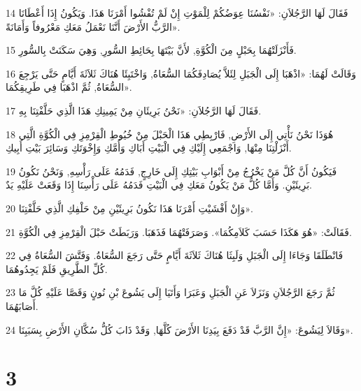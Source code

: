 \par 14 فَقَالَ لَهَا الرَّجُلاَنِ: «نَفْسُنَا عِوَضُكُمْ لِلْمَوْتِ إِنْ لَمْ تُفْشُوا أَمْرَنَا هَذَا. وَيَكُونُ إِذَا أَعْطَانَا الرَّبُّ الأَرْضَ أَنَّنَا نَعْمَلُ مَعَكِ مَعْرُوفاً وَأَمَانَةً».
\par 15 فَأَنْزَلَتْهُمَا بِحَبْلٍ مِنَ الْكُوَّةِ, لأَنَّ بَيْتَهَا بِحَائِطِ السُّورِ, وَهِيَ سَكَنَتْ بِالسُّورِ.
\par 16 وَقَالَتْ لَهُمَا: «اذْهَبَا إِلَى الْجَبَلِ لِئَلاَّ يُصَادِفَكُمَا السُّعَاةُ, وَاخْتَبِئَا هُنَاكَ ثَلاَثَةَ أَيَّامٍ حَتَّى يَرْجِعَ السُّعَاةُ, ثُمَّ اذْهَبَا فِي طَرِيقِكُمَا».
\par 17 فَقَالَ لَهَا الرَّجُلاَنِ: «نَحْنُ بَرِيئَانِ مِنْ يَمِينِكِ هَذَا الَّذِي حَلَّفْتِنَا بِهِ.
\par 18 هُوَذَا نَحْنُ نَأْتِي إِلَى الأَرْضِ, فَارْبِطِي هَذَا الْحَبْلَ مِنْ خُيُوطِ الْقِرْمِزِ فِي الْكُوَّةِ الَّتِي أَنْزَلْتِنَا مِنْهَا, وَاجْمَعِي إِلَيْكِ فِي الْبَيْتِ أَبَاكِ وَأُمَّكِ وَإِخْوَتَكِ وَسَائِرَ بَيْتِ أَبِيكِ.
\par 19 فَيَكُونُ أَنَّ كُلَّ مَنْ يَخْرُجُ مِنْ أَبْوَابِ بَيْتِكِ إِلَى خَارِجٍ, فَدَمُهُ عَلَى رَأْسِهِ, وَنَحْنُ نَكُونُ بَرِيئَيْنِ. وَأَمَّا كُلُّ مَنْ يَكُونُ مَعَكِ فِي الْبَيْتِ فَدَمُهُ عَلَى رَأْسِنَا إِذَا وَقَعَتْ عَلَيْهِ يَدٌ.
\par 20 وَإِنْ أَفْشَيْتِ أَمْرَنَا هَذَا نَكُونُ بَرِيئَيْنِ مِنْ حَلْفِكِ الَّذِي حَلَّفْتِنَا».
\par 21 فَقَالَتْ: «هُوَ هَكَذَا حَسَبَ كَلاَمِكُمَا». وَصَرَفَتْهُمَا فَذَهَبَا. وَرَبَطَتْ حَبْلَ الْقِرْمِزِ فِي الْكُوَّةِ.
\par 22 فَانْطَلَقَا وَجَاءَا إِلَى الْجَبَلِ وَلَبِثَا هُنَاكَ ثَلاَثَةَ أَيَّامٍ حَتَّى رَجَعَ السُّعَاةُ. وَفَتَّشَ السُّعَاةُ فِي كُلِّ الطَّرِيقِ فَلَمْ يَجِدُوهُمَا.
\par 23 ثُمَّ رَجَعَ الرَّجُلاَنِ وَنَزَلاَ عَنِ الْجَبَلِ وَعَبَرَا وَأَتَيَا إِلَى يَشُوعَ بْنِ نُونٍ وَقَصَّا عَلَيْهِ كُلَّ مَا أَصَابَهُمَا.
\par 24 وَقَالاَ لِيَشُوعَ: «إِنَّ الرَّبَّ قَدْ دَفَعَ بِيَدِنَا الأَرْضَ كُلَّهَا, وَقَدْ ذَابَ كُلُّ سُكَّانِ الأَرْضِ بِسَبَبِنَا».

\chapter{3}

